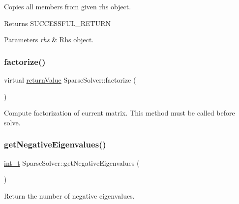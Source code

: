 Copies all members from given rhs object. \begin{DoxyReturn}{Returns}
S\+U\+C\+C\+E\+S\+S\+F\+U\+L\+\_\+\+R\+E\+T\+U\+RN 
\end{DoxyReturn}

\begin{DoxyParams}{Parameters}
{\em rhs} & Rhs object. \\
\hline
\end{DoxyParams}
\mbox{\label{class_sparse_solver_a9005259bc966a2339b3dbf9a6229b9f6}} 
\subsubsection{\texorpdfstring{factorize()}{factorize()}}
{\footnotesize\ttfamily virtual \hyperlink{_message_handling_8hpp_a81d556f613bfbabd0b1f9488c0fa865e}{return\+Value} Sparse\+Solver\+::factorize (\begin{DoxyParamCaption}{ }\end{DoxyParamCaption})\hspace{0.3cm}{\ttfamily [pure virtual]}}

Compute factorization of current matrix. This method must be called before solve. \mbox{\label{class_sparse_solver_aec58a68072134a812784d6dc92282f4d}} 
\subsubsection{\texorpdfstring{get\+Negative\+Eigenvalues()}{getNegativeEigenvalues()}}
{\footnotesize\ttfamily \hyperlink{_types_8hpp_ab6fd6105e64ed14a0c9281326f05e623}{int\+\_\+t} Sparse\+Solver\+::get\+Negative\+Eigenvalues (\begin{DoxyParamCaption}{ }\end{DoxyParamCaption})\hspace{0.3cm}{\ttfamily [virtual]}}

Return the number of negative eigenvalues. \mbox{\label{class_sparse_solver_a99e865b040662425f112e48cb74aa9ce}} 
